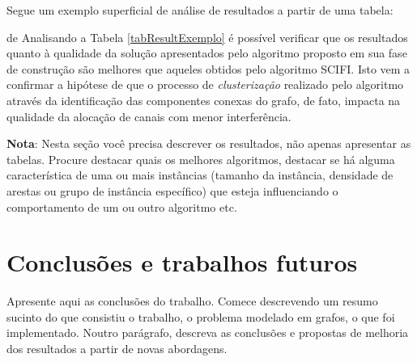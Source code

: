 \documentclass[12pt,fleqn]{article}
\begin{document}
Segue um exemplo superficial de análise de resultados a partir de uma tabela:

de Analisando a Tabela \ref{tabResultExemplo} é possível verificar que os resultados quanto à qualidade da solução apresentados pelo algoritmo proposto em sua fase de construção são melhores que aqueles obtidos pelo algoritmo SCIFI. Isto vem a confirmar a hipótese de que o processo de \textit{clusterização} realizado pelo algoritmo através da identificação das componentes conexas do grafo, de fato, impacta na qualidade da alocação de canais com menor interferência.


\textbf{Nota}: Nesta seção você precisa descrever os resultados, não apenas apresentar as tabelas. Procure destacar quais os melhores algoritmos, destacar se há alguma característica de uma ou mais instâncias (tamanho da instância, densidade de arestas ou grupo de instância específico) que esteja influenciando o comportamento de um ou outro algoritmo etc. 


\section{Conclusões e trabalhos futuros}
\label{secConclusoes}

Apresente aqui as conclusões do trabalho. Comece descrevendo um resumo sucinto do que consistiu o trabalho, o problema modelado em grafos, o que foi implementado. Noutro parágrafo, descreva as conclusões e propostas de melhoria dos resultados a partir de novas abordagens.





\appendix
\end{document}
